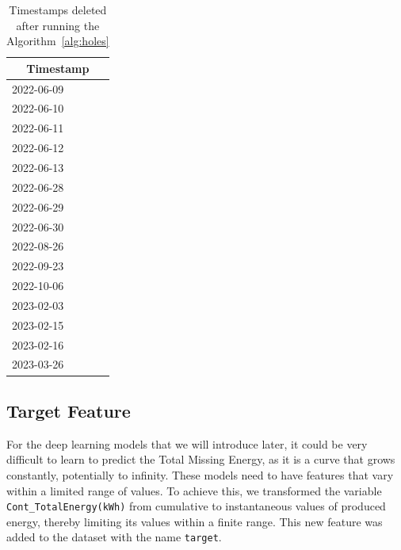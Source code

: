 \begin{minipage}[t]{0.30\linewidth}
	\begin{table}[H]
		\centering
		\begin{tabular}[c]{l}
			\multicolumn{1}{c}{\textbf{Timestamp}} \\
			\hline
			2022-06-09                             \\
			2022-06-10                             \\
			2022-06-11                             \\
			2022-06-12                             \\
			2022-06-13                             \\
			2022-06-28                             \\
			2022-06-29                             \\
			2022-06-30                             \\
			2022-08-26                             \\
			2022-09-23                             \\
			2022-10-06                             \\
			2023-02-03                             \\
			2023-02-15                             \\
			2023-02-16                             \\
			2023-03-26                             \\
		\end{tabular}
		\caption{Timestamps deleted after running the Algorithm~\ref{alg:holes}}
	\end{table}
\end{minipage}

\subsection{Target Feature}
For the deep learning models that we will introduce later,
it could be very difficult to learn to predict the Total Missing Energy,
as it is a curve that grows constantly, potentially to infinity.
These models need to have features that vary within a limited range of
values. To achieve this, we transformed the variable
\verb|Cont_TotalEnergy(kWh)| from cumulative to instantaneous values of
produced energy, thereby limiting its values within a finite range.
This new feature was added to the dataset with the name \verb|target|.

